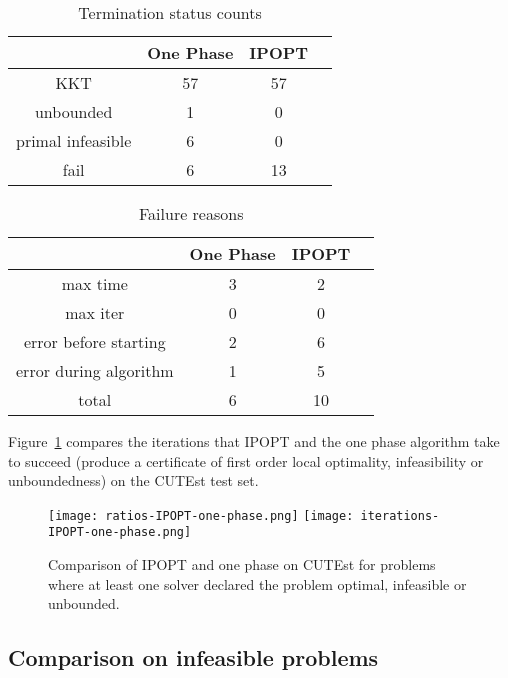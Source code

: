 \documentclass{article}
\begin{document}

\begin{table}[H]
\caption{Termination status counts}\label{tbl:termination-status-counts}
\begin{tabular}{ c c c r }
 &  One Phase &  IPOPT &  \\
  \hline
KKT & 57 & 57 \\
unbounded & 1 & 0  \\
primal infeasible & 6 &  0 \\
fail & 6 & 13 \\
\end{tabular}
\end{table}

\begin{table}[H]
\caption{Failure reasons}
\begin{tabular}{ c c c r }
 &  One Phase & IPOPT \\
  \hline
max time & 3 & 2  \\
max iter &  0 & 0 \\
error before starting & 2 & 6 \\
error during algorithm & 1 & 5 \\
\hline
total & 6 & 10 
\end{tabular}
\end{table}

Figure~\ref{fig:comparison-IPOPT-on-CUTEst} compares the iterations that IPOPT and the one phase algorithm take to succeed (produce a certificate of first order local optimality, infeasibility or unboundedness) on the CUTEst test set.


\begin{figure}[H]
\texttt{[image: ratios-IPOPT-one-phase.png]}
\texttt{[image: iterations-IPOPT-one-phase.png]}
\caption{Comparison of IPOPT and one phase on CUTEst for problems where at least one solver declared the problem optimal, infeasible or unbounded.}\label{fig:comparison-IPOPT-on-CUTEst}
\end{figure}


\subsection{Comparison on infeasible problems}\label{sec:infeas}
\end{document}
